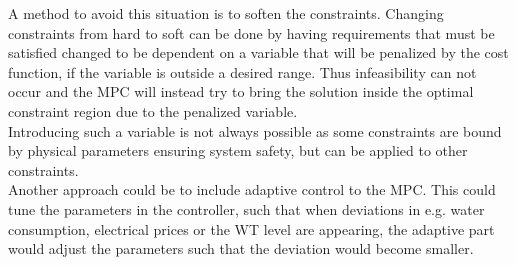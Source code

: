 A method to avoid this situation is to soften the constraints. Changing constraints from hard to soft can be done by having requirements that must be satisfied changed to be dependent on a variable that will be penalized by the cost function, if the variable is outside a desired range. Thus infeasibility can not occur and the MPC will instead try to bring the solution inside the optimal constraint region due to the penalized variable.\\   
Introducing such a variable is not always possible as some constraints are bound by physical parameters ensuring system safety, but can be applied to other constraints.\\

Another approach could be to include adaptive control to the MPC. This could tune the parameters in the controller, such that when deviations in e.g. water consumption, electrical prices or the WT level are appearing, the adaptive part would adjust the parameters such that the deviation would become smaller.








